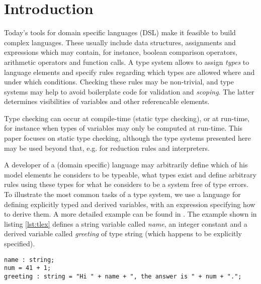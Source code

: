 \section{Introduction}

Today's tools for domain specific languages (DSL) make it feasible to build
complex languages. These usually include data structures, assignments and
expressions which may contain, for instance, boolean comparison operators,
arithmetic operators and function calls. A type system allows to assign
\emph{types} to language elements and specify rules regarding which types are
allowed where and under which conditions. Checking these rules may be
non-trivial, and type systems may help to avoid boilerplate code for validation
and \emph{scoping}. The latter determines visibilities of variables and other
referencable elements.

Type checking can occur at compile-time (static type checking), or
at run-time, for instance when types of variables may only be computed at
run-time. This paper focuses on static type checking, although the type systems
presented here may be used beyond that, e.g. for reduction rules and
interpreters.

A developer of a (domain specific) language may arbitrarily define which of his
model elements he considers to be typeable, what types exist and define
arbitrary rules using these types for what he considers to be a system free of
type errors.
To illustrate the most common tasks of a type system, we use a language for
defining explicitly typed and derived variables, with an expression specifying
how to derive them. A more detailed example can be found in \cite{mvdsl}. The
example shown in listing \ref{lst:tlex} defines a string variable called
\emph{name}, an integer constant and a derived variable called \emph{greeting}
of type string (which happens to be explicitly specified).

\begin{lstlisting}[float,label=lst:tlex,caption=Example for a typed language.]
name : string;
num = 41 + 1;
greeting : string = "Hi " + name + ", the answer is " + num + ".";
\end{lstlisting}

